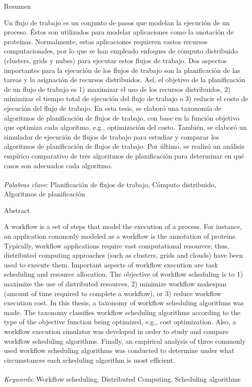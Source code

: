 \begin{center}
Resumen
\end{center}
\noindent Un flujo de trabajo es un conjunto de pasos que modelan la ejecución de un proceso. Éstos son utilizados para modelar aplicaciones como la anotación de proteínas. Normalmente, estas aplicaciones requieren vastos recursos computacionales, por lo que se han empleado enfoques de cómputo distribuido (clusters, grids y nubes) para ejecutar estos flujos de trabajo. Dos aspectos importantes para la ejecución de los flujos de trabajo son la planificación de las tareas y la asignación de recursos distribuidos. Así, el objetivo de la planificación de un flujo de trabajo es 1) maximizar el uso de los recursos distribuidos, 2) minimizar el tiempo total de ejecución del flujo de trabajo o 3) reducir el costo de ejecución del flujo de trabajo. En esta tesis, se elaboró una taxonomía de algoritmos de planificación de flujos de trabajo, con base en la función objetivo que optimiza cada algoritmo, e.g., optimización del costo. También, se elaboró un simulador de ejecución de flujos de trabajo para estudiar y comparar los algoritmos de planificación de flujos de trabajo. Por último, se realizó un análisis empírico comparativo de tres algoritmos de planificación para determinar en qué casos son adecuados cada algoritmo.
\\\\
\noindent \emph{Palabras clave}: Planificación de flujos de trabajo, Cómputo distribuido, Algoritmos de planificación

\begin{center}
Abstract
\end{center}
\noindent A workflow is a set of steps that model the execution of a process. For instance, an application commonly modeled as a workflow is the annotation of proteins. Typically, workflow applications require vast computational resources; thus, distributed computing approaches (such as clusters, grids and clouds) have been used to execute them. Important aspects of workflow execution are task scheduling and resource allocation. The objective of workflow scheduling is to 1) maximize the use of distributed resources, 2) minimize workflow makespan (amount of time required to complete a workflow), or 3) reduce workflow execution cost. In this thesis, a taxonomy of workflow scheduling algorithms was made. The taxonomy classifies workflow scheduling algorithms according to the type of the objective function being optimized, e.g., cost optimization. Also, a workflow execution simulator was developed in order to study and compare workflow scheduling algorithms. Finally, an empirical analysis of three commonly used workflow scheduling algorithms was conducted to determine under what circumstances each scheduling algorithm is most efficient.
\\\\
\noindent \emph{Keywords}: Workflow scheduling, Distributed Computing, Scheduling algorithms

\clearpage

